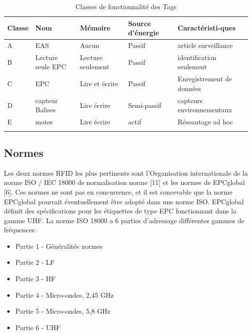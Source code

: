 \documentclass[11pt, a4paper, twoside]{book}
\begin{document}
\begin{longtable}{|p{}|p{}|p{}| p{}|p{}|}
\hline
\textbf{Classe} & \textbf{Nom} & \textbf{Mémoire} & \textbf{Source d'énergie} & \textbf{Caractéristi-ques} \\
\hline
A & EAS & Aucun & Passif & article surveillance \\
\hline
B & Lecture seule EPC & Lecture seulement & Passif & identification seulement \\
\hline
C & EPC & Lire et écrire & Passif & Enregistrement de données \\
\hline
D & capteur Balises & Lire écrire & Semi-passif & capteurs environnementaux \\
\hline
E & motes & Lire écrire & actif & Réseautage ad hoc \\
\hline
\caption{Classes de fonctionnalité des Tags}
\end{longtable}

\subsection{Normes}

Les deux normes RFID les plus pertinents sont l'Organisation internationale de la norme ISO / IEC 18000 de normalisation norme [11] et les normes de EPCglobal [6]. Ces normes ne sont pas en concurrence, et il est concevable que la norme EPCglobal pourrait éventuellement être adopté dans une norme ISO.
EPCglobal définit des spécifications pour les étiquettes de type EPC fonctionnant dans la gamme UHF.
La norme ISO 18000 a 6 parties d'adressage différentes gammes de fréquences:
\begin{itemize}
\item Partie 1 - Généralités normes
\item Partie 2 - LF
\item Partie 3 - HF
\item Partie 4 - Micro-ondes, 2,45 GHz
\item Partie 5 - Micro-ondes, 5,8 GHz
\item Partie 6 - UHF\\
\end{itemize}
\end{document}
